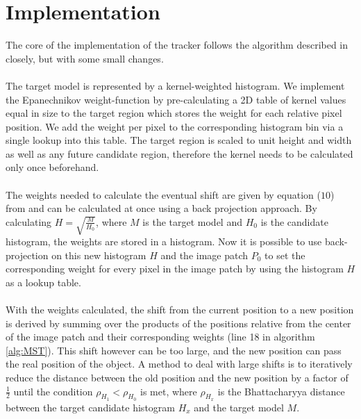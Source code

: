 \documentclass[a4paper,11pt]{article}
\begin{document}
	\section{Implementation}
		The core of the implementation of the tracker follows the algorithm described
		in \cite{KBOT} closely, but with some small changes.
		\\ \\
		The target model is represented by a kernel-weighted histogram. We implement
		the Epanechnikov weight-function by pre-calculating a 2D table of kernel values
		equal in size to the target region which stores the weight for each relative pixel
		position. We add the weight per pixel to the corresponding histogram bin via a single
		lookup into this table. The target region is scaled to unit height and width as well
		as any future candidate region, therefore the kernel needs to be calculated only once
		beforehand.
		\\ \\
		The weights needed to calculate the eventual shift are given by equation ($10$)
		from \cite{KBOT} and can be calculated at once using a back projection approach.
		By calculating $H=\sqrt{\frac{M}{H_0}}$, where $M$ is the target model and $H_0$
		is the candidate histogram, the weights are stored in a histogram. Now it is
		possible to use back-projection on this new histogram $H$ and the image patch
		$P_0$ to set the corresponding weight for every pixel in the image patch by
		using the histogram $H$ as a lookup table.
		\\ \\
		With the weights calculated, the shift from the current position to a new position
		is derived by summing over the products of the positions relative from the center
		of the image patch and their corresponding weights (line 18 in algorithm \ref{alg:MST}).
		This shift however can be too large, and the new position can pass the real position
		of the object. A method to deal with large shifts is to iteratively reduce the distance
		between the old position and the new position by a factor of $\frac{1}{2}$ until the
		condition $\rho_{H_1} < \rho_{H_0}$ is met, where $\rho_{H_x}$ is the Bhattacharyya
		distance between the target candidate histogram $H_x$ and the target model $M$.
\end{document}
